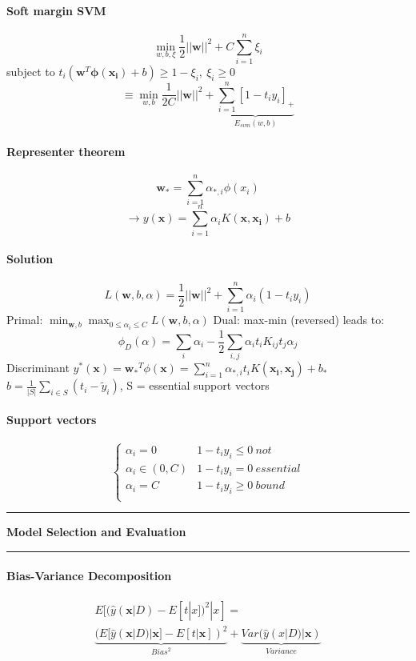 \documentclass[7pt]{scrartcl}
\newlength{\secskip}
\renewcommand{\section}[1]{
  \vspace{\secskip}
  \hrule\vspace{.3em}
  \textbf{#1}
  \vspace{.3em}
  \hrule
  \vspace{\secskip}
}
\renewcommand{\vec}{\mathbf}
\begin{document}
\begin{multicols}{4}
\paragraph{Soft margin SVM}
\[\min_{w,b,\xi} \frac{1}{2}||\vec{w}||^2 + C \sum_{i=1}^n \xi_i\]
subject to $t_i(\vec{w}^T \vec{\phi(x_i)} + b) \geq 1-\xi_i,~ \xi_i \geq 0$
\[\equiv \min_{w,b} \frac{1}{2C}||\vec{w}||^2 + \underbrace{\sum_{i=1}^n [1-t_iy_i]_+}_{E_{svm}(w,b)}\]
\paragraph{Representer theorem}
\[\vec{w_*} = \sum_{i=1}^n \alpha_{*,i} \phi(x_i)\]
\[\rightarrow y(\vec{x}) = \sum_{i=1}^n \alpha_i K(\vec{x},\vec{x_i})+b\]
\paragraph{Solution}
\[L(\vec{w},b,\alpha) = \frac{1}{2}||\vec{w}||^2 + \sum_{i=1}^n \alpha_i(1-t_iy_i)\]
Primal: $\min_{\vec{w},b} \max_{0 \leq \alpha_i \leq C} L(\vec{w},b,\alpha)$
Dual: max-min (reversed) leads to:
\[\phi_D(\alpha) = \sum_i \alpha_i - \frac{1}{2} \sum_{i,j} \alpha_i t_i K_{ij} t_j \alpha_j\]
Discriminant $y^*(\vec{x}) = \vec{w_*}^T \phi(\vec{x}) = \sum_{i=1}^n \alpha_{*,i} t_i K(\vec{x_i},\vec{x_j}) + b_*$\\
$b = \frac{1}{|S|} \sum_{i \in S} (t_i - \tilde{y}_i)$, S = essential support vectors
\paragraph{Support vectors}
\begin{equation*}
\left\lbrace
\begin{array}{ll}
\alpha_i = 0 & 1-t_iy_i \leq 0 ~not \\
\alpha_i \in (0,C) & 1-t_iy_i = 0 ~essential\\
\alpha_i = C & 1-t_iy_i \geq 0 ~bound\\
\end{array}
\right.
\end{equation*}

\section{Model Selection and Evaluation}
\paragraph{Bias-Variance Decomposition}
\begin{align*}
E[(\hat{y}(\vec{x}|D) - E[t|x])^2|x] = \\ \underbrace{(E[\hat{y}(\vec{x}|D)|\vec{x}] - E[t|\vec{x}])^2}_{Bias^2} + \underbrace{Var(\hat{y}(x|D) | \vec{x})}_{Variance}
\end{align*}

\end{multicols}
\end{document}
